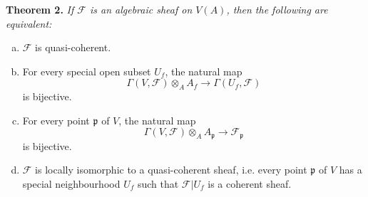 \documentclass{article}
\newenvironment{itenv}[1]
  {\phantomsection\par\medskip\noindent\textbf{#1.}\itshape}
  {\medskip}
\newcommand{\scr}[1]{{\mathscr{#1}}}
\begin{document}
\begin{itenv}{Theorem 2}
\label{theorem2}
  If $\scr{F}$ is an algebraic sheaf on $V(A)$, then the following are equivalent:
  \begin{enumerate}[(a)]
    \item $\scr{F}$ is quasi-coherent.
    \item For every special open subset $U_f$, the natural map
      \[
        \Gamma(V,\scr{F})\otimes_A A_f \to \Gamma(U_f,\scr{F})
      \]
      is bijective.
    \item For every point $\mathfrak{p}$ of $V$, the natural map
      \[
        \Gamma(V,\scr{F})\otimes_A A_\mathfrak{p} \to \scr{F}_\mathfrak{p}
      \]
      is bijective.
    \item $\scr{F}$ is locally isomorphic to a quasi-coherent sheaf, i.e. every point $\mathfrak{p}$ of $V$ has a special neighbourhood $U_f$ such that $\scr{F}|U_f$ is a coherent sheaf.
  \end{enumerate}
\end{itenv}
\end{document}
